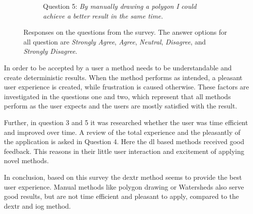 \begin{figure}
\begin{subfigure}[t]{0.48\textwidth}
		\caption{
			Question 5: \textit{By manually drawing a polygon I could achieve a better result in the same time.}
		} \label{fig:ch5:sec4:q5}
	\end{subfigure}
	\caption [Watershed User Interaction]{
		Responses on the questions from the survey.
		The answer options for all question are \textit{Strongly Agree}, \textit{Agree}, \textit{Neutral}, \textit{Disagree}, and \textit{Strongly Disagree}.
	} \label{fig:ch5:sec4:suvery}
\end{figure}

In order to be accepted by a user a method needs to be understandable and create deterministic results.
When the method performs as intended, a pleasant user experience is created, while frustration is caused otherwise.
These factors are investigated in the questions one and two, which represent that all methods perform as the user expects and the users are mostly satisfied with the result.

Further, in question 3 and 5 it was researched whether the user was time efficient and improved over time.
A review of the total experience and the pleasantly of the application is asked in Question 4.
Here the \gls{dl} based methods received good feedback.
This reasons in their little user interaction and excitement of applying novel methods.

In conclusion, based on this survey the \gls{dextr} method seems to provide the best user experience.
Manual methods like polygon drawing or Watersheds also serve good results, but are not time efficient and pleasant to apply, compared to the \gls{dextr} and \gls{iog} method.  


